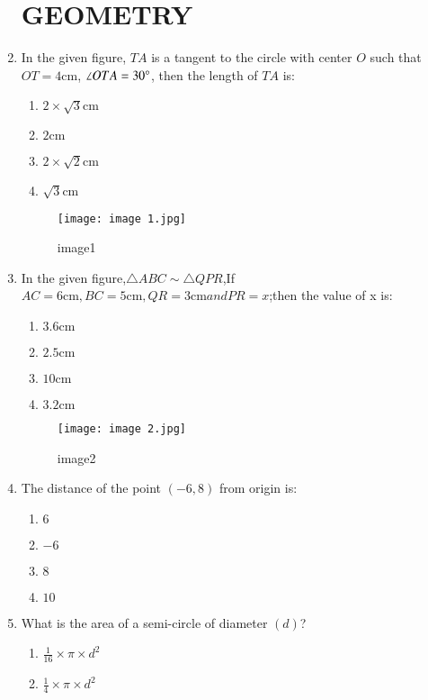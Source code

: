 \documentclass[12pt,-letter paper]{article}
\providecommand{\brak}[1]{\ensuremath{\left(#1\right)}}
\begin{document}
\begin{enumerate}
\begin{center}
\section*{GEOMETRY}
\end{center}
 \item In the given figure, $TA$ is a tangent to the circle with center $O$ such that $OT = 4\mathrm{cm}$, $\angle OTA = 30\degree$, then the length of $TA$ is:
    \begin{enumerate}
        \item $2 \times \sqrt{3} \mathrm{cm}$
        \item $2\mathrm{cm}$
        \item $2 \times \sqrt{2}\mathrm{cm}$
        \item $\sqrt{3}\mathrm{cm}$
    \end{enumerate}
    \newpage
\begin{figure}[!ht]
\centering
\texttt{[image: image 1.jpg]}
\label{fig:image1}
	\caption{image1}
\end{figure}
\item In the given figure,$\triangle ABC \sim \triangle QPR$,If $AC = 6\mathrm{cm},BC = 5 \mathrm{cm},QR = 3\mathrm{cm}  and PR = x$;then the value of  x is:
	\begin{enumerate}
	\item $3.6 \mathrm{cm}$
	\item $2.5\mathrm{cm}$
	\item $10 \mathrm{cm}$
	\item $3.2 \mathrm{cm}$
	\end{enumerate}
	\begin{figure}[!ht]
\centering
\texttt{[image: image 2.jpg]}
\label{fig:image1}
	\caption{image2}
\end{figure}
\item The distance of the point $\brak{-6,8}$ from origin is:
	\begin{enumerate}
	\item $6$
	\item $-6$
	\item $8$
	\item $10$
\end{enumerate}
\item What is the area of a semi-circle of diameter $\brak{d}$?
\begin{enumerate}
    \item $\frac{1}{16} \times \pi \times d^2$
    \item $\frac{1}{4} \times \pi \times d^2$

\end{enumerate}
\end{enumerate}
\end{document}
